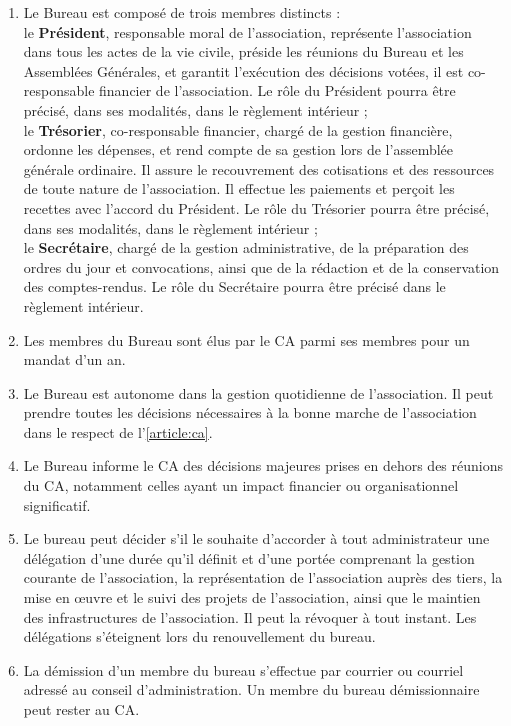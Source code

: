 \documentclass[12pt, a4paper]{article}
\begin{document}
\begin{enumerate}
    \item Le Bureau est composé de trois membres distincts :\vspace{.5cm}\\
le \textbf{Président}, responsable moral de l’association, représente l’association dans tous les actes de la vie civile, préside les réunions du Bureau et les Assemblées Générales, et garantit l'exécution des décisions votées, il est co-responsable financier de l’association. Le rôle du Président pourra être précisé, dans ses modalités, dans le règlement intérieur ;\vspace{.5cm}\\
le \textbf{Trésorier}, co-responsable financier, chargé de la gestion financière, ordonne les dépenses, et rend compte de sa gestion lors de l’assemblée générale ordinaire. Il assure le recouvrement des cotisations et des ressources de toute nature de l’association. Il effectue les paiements et perçoit les recettes avec l’accord du Président. Le rôle du Trésorier pourra être précisé, dans ses modalités, dans le règlement intérieur ;\vspace{.5cm}\\
le \textbf{Secrétaire}, chargé de la gestion administrative, de la préparation des ordres du jour et convocations, ainsi que de la rédaction et de la conservation des comptes-rendus. Le rôle du Secrétaire pourra être précisé dans le règlement intérieur.
    \item Les membres du Bureau sont élus par le CA parmi ses membres pour un mandat d’un an.
    \item Le Bureau est autonome dans la gestion quotidienne de l’association. Il peut prendre toutes les décisions nécessaires à la bonne marche de l’association dans le respect de l’\ref{article:ca}.
    \item Le Bureau informe le CA des décisions majeures prises en dehors des réunions du CA, notamment celles ayant un impact financier ou organisationnel significatif.
    \item Le bureau peut décider s’il le souhaite d’accorder à tout administrateur une délégation d’une durée qu’il définit et d’une portée comprenant la gestion courante de l’association, la représentation de l’association auprès des tiers, la mise en œuvre et le suivi des projets de l’association, ainsi que le maintien des infrastructures de l’association. Il peut la révoquer à tout instant. Les délégations s’éteignent lors du renouvellement du bureau.
    \item La démission d’un membre du bureau s’effectue par courrier ou courriel adressé au conseil d’administration. Un membre du bureau démissionnaire peut rester au CA.
\end{enumerate}
\end{document}
